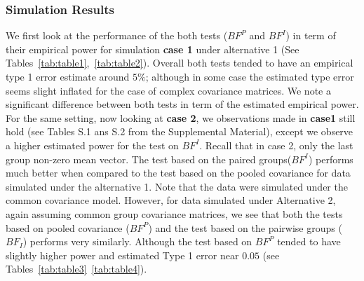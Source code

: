 \documentclass[12pt]{article}
\theoremstyle{plain}%
\theoremstyle{definition}
\begin{document}
\subsubsection{Simulation Results}
We first look at the performance of the both tests ($BF^{P}$ and $BF^{I}$) in term of their empirical power for simulation {\bf case 1} under alternative 1 (See Tables~\ref{tab:table1},~\ref{tab:table2}). 
Overall both tests tended to have an empirical type 1 error estimate around $5\%$; although in  some case the estimated type error seems slight inflated for the case of complex covariance matrices. 
We note a significant difference between both tests in term of the estimated empirical power. 
For the same setting, now looking at {\bf case 2}, we observations made in {\bf case1} still hold (see Tables S.1 ans S.2 from the Supplemental Material), except we observe a higher estimated power for the test on $BF^{I}$. Recall that in case 2, only the last group non-zero mean vector. 
The test based on the paired groups($BF^{I}$) performs much better when compared to the test based on the pooled covariance for data simulated under the alternative 1. 
Note that the data were simulated under the common covariance model. 
However, for data simulated under Alternative 2, again assuming common group covariance matrices, we see that both the tests based on pooled covariance ($BF^{P}$) and the test based on the pairwise groups ($BF_I$) performs very similarly. Although the test based on $BF^{P}$ tended to have slightly higher power and estimated Type 1 error near $0.05$ (see Tables~\ref{tab:table3}~\ref{tab:table4}).
\end{document}
